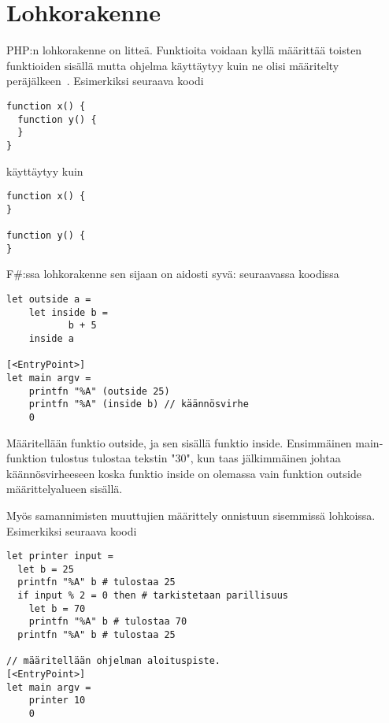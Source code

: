 \section{Lohkorakenne}


PHP:n lohkorakenne on litteä. Funktioita voidaan kyllä määrittää toisten funktioiden sisällä mutta ohjelma käyttäytyy kuin ne olisi määritelty peräjälkeen~\cite{stackoverflow_1}. Esimerkiksi seuraava koodi

\lstset{language=PHP,
	basicstyle=\ttfamily,
	breaklines=true,
	columns=fullflexible}

\begin{lstlisting}
function x() {
  function y() {
  }
}
\end{lstlisting}

käyttäytyy kuin

\begin{lstlisting}
function x() {
}

function y() {
}
\end{lstlisting}


F\#:ssa lohkorakenne sen sijaan on aidosti syvä: seuraavassa koodissa


\lstset{
	language=FSharp,
	basicstyle=\ttfamily,
	breaklines=true,
	columns=fullflexible
}

\begin{lstlisting}
let outside a =
    let inside b =
           b + 5
    inside a

[<EntryPoint>]
let main argv =
    printfn "%A" (outside 25)
    printfn "%A" (inside b) // käännösvirhe
    0
\end{lstlisting}

Määritellään funktio outside, ja sen sisällä funktio inside. Ensimmäinen main-funktion tulostus tulostaa tekstin "30", kun taas jälkimmäinen johtaa käännösvirheeseen koska funktio inside on olemassa vain funktion outside määrittelyalueen sisällä.

Myös samannimisten muuttujien määrittely onnistuun sisemmissä lohkoissa. Esimerkiksi seuraava koodi

\begin{lstlisting}
let printer input =
  let b = 25
  printfn "%A" b # tulostaa 25
  if input % 2 = 0 then # tarkistetaan parillisuus
    let b = 70
    printfn "%A" b # tulostaa 70
  printfn "%A" b # tulostaa 25

// määritellään ohjelman aloituspiste.
[<EntryPoint>]
let main argv =
    printer 10
    0
\end{lstlisting}

